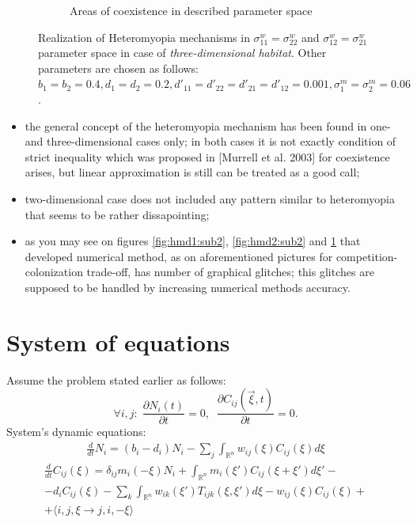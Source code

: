 \documentclass[%
 aip,
rsi,%
 amsmath,amssymb,
 reprint,%
]{revtex4-1}
\begin{document}
\begin{figure}[ht]
\begin{subfigure}{.5\textwidth}
		\caption{Areas of coexistence in described parameter space}
		\label{fig:hmd3:sub2}
	\end{subfigure}
	\caption{Realization of Heteromyopia mechanisms in  $\sigma_{11}^{w}=\sigma_{22}^{w}$ and $\sigma_{12}^{w}=\sigma_{21}^{w}$ parameter space in case of \emph{three-dimensional habitat}. Other parameters are chosen as follows: $b_{1}=b_{2}=0.4
		, d_{1}=d_{2}=0.2
		, d'_{11}=d'_{22}=d'_{21}=d'_{12}=0.001,
		\sigma_{1}^{m}=\sigma_{2}^{m}=0.06$. }
	\label{fig:hmd3}
\end{figure}


\begin{itemize}
	\item the general concept of the heteromyopia mechanism has been found in one- and three-dimensional cases only; 
	in both cases it is not exactly condition of strict inequality which was proposed in [Murrell et al. 2003] for coexistence arises, but linear approximation is still can be treated as a good call; 
	\item two-dimensional case does not included any pattern similar to heteromyopia that seems to be rather dissapointing;
	\item as you may see on figures \ref{fig:hmd1:sub2}, \ref{fig:hmd2:sub2} and \ref{fig:hmd3:sub2} that developed numerical method, as on aforementioned pictures for competition-colonization trade-off, has number of graphical glitches; this glitches are supposed to be handled by increasing numerical methods accuracy.
\end{itemize}


\newpage

\appendix

\section{System of equations}

\label{sec:appA}

Assume the problem stated earlier as follows:
\[
\forall i,j: \; \frac{\partial N_i(t)}{\partial t}=0, \;\; \frac{\partial C_{ij}(\vec{\xi}, t)}{\partial t}=0.
\]
System's dynamic equations:
\begin{eqnarray*}
	\frac{d}{dt}N_{i}=(b_{i}-d_{i})N_{i}-\sum_{j}\int_{\mathbb{R}^{n}}w_{ij}(\xi)C_{ij}(\xi)d\xi
\end{eqnarray*}
\begin{eqnarray*}
	\frac{d}{dt}C_{ij}(\xi)= \delta_{ij}m_{i}(-\xi)N_{i}+\int_{\mathbb{\mathbb{R}}^{n}}m_{i}(\xi')C_{ij}(\xi+\xi')d\xi'-\\
	-d_{i}C_{ij}(\xi)-\sum_{k}\int_{\mathbb{\mathbb{R}}^{n}}w_{ik}(\xi')T_{ijk}(\xi,\xi')d\xi-w_{ij}(\xi)C_{ij}(\xi)+\\+\langle i,j,\xi\to j,i,-\xi\rangle
\end{eqnarray*}
\end{document}
